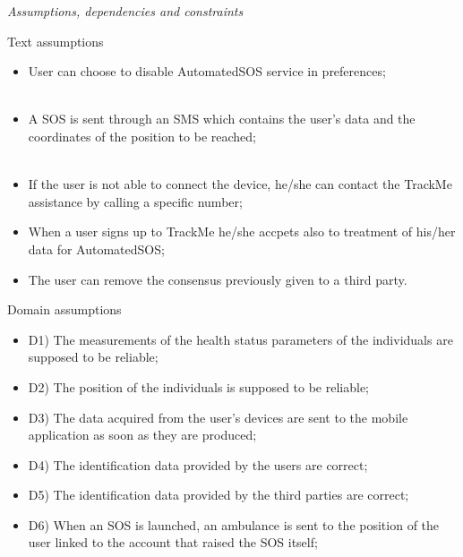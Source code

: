 \documentclass{article}
\begin{document}
\begin{legal}
\begin{legal}
{\begin{itemize}
			\end{itemize}
			}
		\item \textit{Assumptions, dependencies and constraints}\\
			\begin{legal}
    			\item Text assumptions\\
    			{\normalfont
				\begin{itemize}
					\item User can choose to disable AutomatedSOS service in preferences;\\\
					\item A SOS is sent through an SMS which contains the user's data and the coordinates of the position to be reached;\\\
					\item If the user is not able to connect the device, he/she can contact the TrackMe assistance by calling a specific number;\\
					\item When a user signs up to TrackMe he/she accpets also to treatment of his/her data for AutomatedSOS;\\
					\item The user can remove the consensus previously given to a third party.\\
				\end{itemize}}
			\item Domain assumptions \\
			{\normalfont
				\begin{itemize}
				\item D1) The measurements of the health status parameters of the individuals are supposed to be reliable;\\
				\item D2) The position of the individuals is supposed to be reliable;\\
				\item D3) The data acquired from the user’s devices are sent to the mobile application as soon as they are produced;\\
				\item D4) The identification data provided by the users are correct;\\
				\item D5) The identification data provided by the third parties are correct;\\
				\item D6) When an SOS is launched, an ambulance is sent to the position of the user linked to the account that raised the SOS itself;\\

\end{itemize}}
\end{legal}
\end{legal}
\end{legal}
\end{document}
